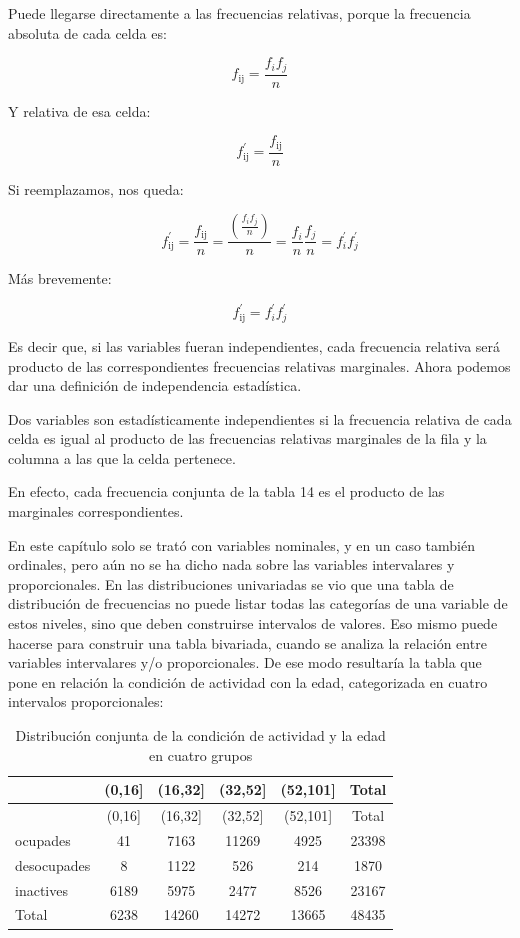\documentclass[]{book}
\begin{document}
Puede llegarse directamente a las frecuencias relativas, porque la
frecuencia absoluta de cada celda es:

\[f_{\text{ij}} = \frac{f_{i}f_{j}}{n}\]

Y relativa de esa celda:

\[f_{\text{ij}}^{'} = \frac{f_{\text{ij}}}{n}\]

Si reemplazamos, nos queda:

\[f_{\text{ij}}^{'} = \frac{f_{\text{ij}}}{n} = \frac{\left( \frac{f_{i}f_{j}}{n} \right)}{n} = \frac{f_{i}}{n}\frac{f_{j}}{n} = f_{i}^{'}f_{j}^{'}\]

Más brevemente:

\[f_{\text{ij}}^{'} = f_{i}^{'}f_{j}^{'}\]

Es decir que, si las variables fueran independientes, cada frecuencia
relativa será producto de las correspondientes frecuencias relativas
marginales. Ahora podemos dar una definición de independencia
estadística.

Dos variables son estadísticamente independientes si la frecuencia
relativa de cada celda es igual al producto de las frecuencias relativas marginales de la fila y la columna a las que la celda pertenece.

En efecto, cada frecuencia conjunta de la tabla 14 es el producto de las marginales correspondientes.

En este capítulo solo se trató con variables nominales, y en un caso también ordinales, pero aún no se ha dicho nada sobre las variables intervalares y proporcionales. En las distribuciones univariadas se vio que una tabla de distribución de frecuencias no puede listar todas las categorías de una variable de estos niveles, sino que deben construirse intervalos de valores. Eso mismo puede hacerse para construir una tabla bivariada, cuando se analiza la relación entre variables intervalares y/o proporcionales. De ese modo resultaría la tabla que pone en relación la condición de actividad con la edad, categorizada en cuatro intervalos proporcionales:

\begin{longtable}[]{@{}lccccc@{}}
\caption{\label{tab:unnamed-chunk-146}Distribución conjunta de la condición de actividad y la edad en cuatro grupos}\tabularnewline
\toprule
& (0,16{]} & (16,32{]} & (32,52{]} & (52,101{]} & Total\tabularnewline
\midrule
\endfirsthead
\toprule
& (0,16{]} & (16,32{]} & (32,52{]} & (52,101{]} & Total\tabularnewline
\midrule
\endhead
ocupades & 41 & 7163 & 11269 & 4925 & 23398\tabularnewline
desocupades & 8 & 1122 & 526 & 214 & 1870\tabularnewline
inactives & 6189 & 5975 & 2477 & 8526 & 23167\tabularnewline
Total & 6238 & 14260 & 14272 & 13665 & 48435\tabularnewline
\bottomrule
\end{longtable}
\end{document}
